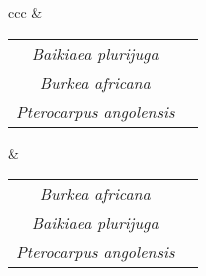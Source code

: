 \begin{table}[tb]
\begin{tabular}{ccc}
\hline
{} & \begin{tabular}[c]{@{}c@{}c@{}} \textit{Baikiaea plurijuga} \\\textit{Burkea africana} \\\textit{Pterocarpus angolensis} \end{tabular} & \begin{tabular}[c]{@{}c@{}c@{}} \textit{Burkea africana} \\\textit{Baikiaea plurijuga} \\\textit{Pterocarpus angolensis} \end{tabular} \\ 
\hline
\end{tabular} 
\end{table} 

